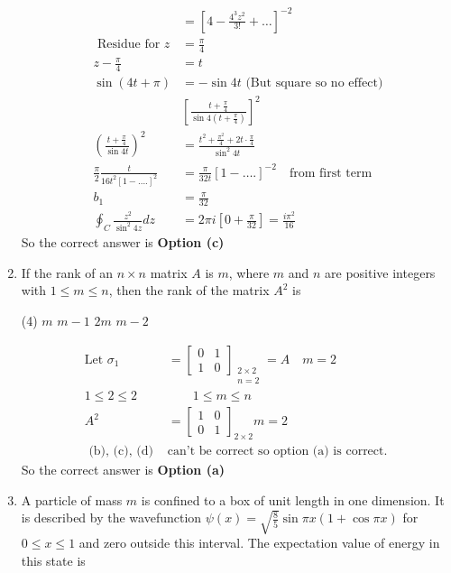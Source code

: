 \begin{enumerate}
\begin{answer}
\begin{align*}
	&=\left[4-\frac{4^{3} z^{2}}{3 !}+\ldots\right]^{-2}\\
\text{	Residue for }z&=\frac{\pi}{4}\\
	z-\frac{\pi}{4}&=t\\
	\sin (4 t+\pi)&=-\sin 4 t
\text{	(But square so no effect)}\\
&\left[\frac{t+\frac{\pi}{4}}{\sin 4\left(t+\frac{\pi}{4}\right)}\right]^{2}\\
\left(\frac{t+\frac{\pi}{4}}{\sin 4 t}\right)^{2}&=\frac{t^{2}+\frac{\pi^{2}}{4}+2 t \cdot \frac{\pi}{4}}{\sin ^{2} 4 t} \\
\frac{\pi}{2} \frac{t}{16 t^{2}[1-\ldots .]^{2}}&=\frac{\pi}{32 t}[1-\ldots .]^{-2} \quad \text{from first term}\\
b_{1}&=\frac{\pi}{32}\\
\oint_{C} \frac{z^{2}}{\sin ^{2} 4 z} d z&=2 \pi i\left[0+\frac{\pi}{32}\right]=\frac{i \pi^{2}}{16}
	\end{align*}
	So the correct answer is \textbf{Option (c)}
\end{answer}
\item If the rank of an $n \times n$ matrix $A$ is $m$, where $m$ and $n$ are positive integers with $1 \leq m \leq n$, then the rank of the matrix $A^{2}$ is
 \begin{tasks}(4)
	\task[\textbf{a.}]$m$
	\task[\textbf{b.}]$m-1$
	\task[\textbf{c.}]$2 m$
	\task[\textbf{d.}]$m-2$ 
\end{tasks}
\begin{answer}
	\begin{align*}
	\text{Let }\sigma_{1}&=\left[\begin{array}{ll}0 & 1 \\ 1 & 0\end{array}\right]_{\substack{2 \times 2 \\ n=2}}=A \quad m=2\\
	1 \leq 2 \leq 2 &\qquad 1 \leq m \leq n\\
	A^{2}&=\left[\begin{array}{ll}
	1 & 0 \\
	0 & 1
	\end{array}\right]_{2 \times 2} m=2\\
	\text { (b), (c), (d) }&\text{can't be correct so option (a) is correct. }
	\end{align*}
		So the correct answer is \textbf{Option (a)}
\end{answer}
\item A particle of mass $m$ is confined to a box of unit length in one dimension. It is described by the wavefunction $\psi(x)=\sqrt{\frac{8}{5}} \sin \pi x(1+\cos \pi x)$ for $0 \leq x \leq 1$ and zero outside this interval. The expectation value of energy in this state is

\end{enumerate}
